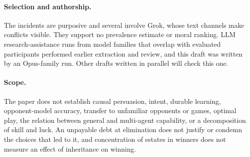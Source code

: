 \paragraph{Selection and authorship.} The incidents are purposive and several involve Grok, whose text channels make conflicts visible. They support no prevalence estimate or moral ranking. LLM research-assistance runs from model families that overlap with evaluated participants performed earlier extraction and review, and this draft was written by an Opus-family run. Other drafts written in parallel will check this one.

\paragraph{Scope.} The paper does not establish causal persuasion, intent, durable learning, opponent-model accuracy, transfer to unfamiliar opponents or games, optimal play, the relation between general and multi-agent capability, or a decomposition of skill and luck. An unpayable debt at elimination does not justify or condemn the choices that led to it, and concentration of estates in winners does not measure an effect of inheritance on winning.
